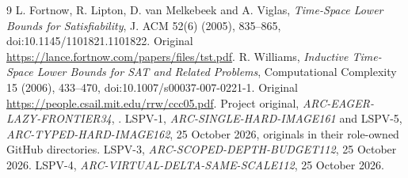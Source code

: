 \documentclass[11pt]{article}
\begin{document}
\begin{thebibliography}{9}
 L. Fortnow, R. Lipton, D. van Melkebeek and A. Viglas,
\emph{Time-Space Lower Bounds for Satisfiability},
J. ACM 52(6) (2005), 835--865,
doi:10.1145/1101821.1101822.
Original \url{https://lance.fortnow.com/papers/files/tst.pdf}.
 R. Williams,
\emph{Inductive Time-Space Lower Bounds for SAT and Related Problems},
Computational Complexity 15 (2006), 433--470,
doi:10.1007/s00037-007-0221-1.
Original \url{https://people.csail.mit.edu/rrw/ccc05.pdf}.
 Project original,
\emph{ARC-EAGER-LAZY-FRONTIER34},
.
 LSPV-1, \emph{ARC-SINGLE-HARD-IMAGE161}
and LSPV-5, \emph{ARC-TYPED-HARD-IMAGE162},
25 October 2026, originals in their role-owned GitHub directories.
 LSPV-3, \emph{ARC-SCOPED-DEPTH-BUDGET112},
25 October 2026.
 LSPV-4, \emph{ARC-VIRTUAL-DELTA-SAME-SCALE112},
25 October 2026.
\end{thebibliography}
\end{document}

